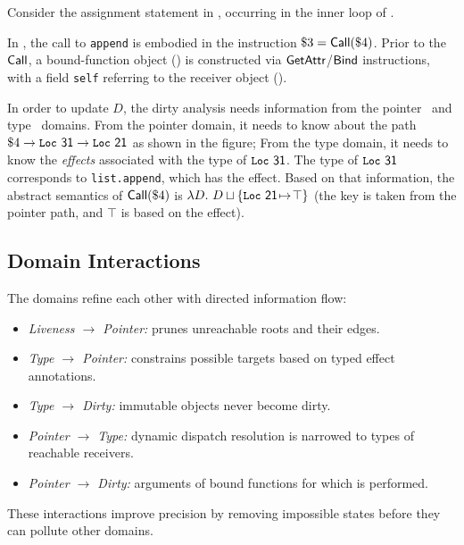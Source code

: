\begin{example}
Consider the assignment statement in ,
occurring in the inner loop of .
\end{example}

%
In \spytecode, the call to \lstinline|append| is embodied
in the instruction $\$3 = \textsf{Call}(\$4)$.
Prior to the $\textsf{Call}$, a bound-function object () is
constructed via $\textsf{GetAttr}$/$\textsf{Bind}$ instructions, with a field
\lstinline|self| referring to the receiver object ().

In order to update $D$, the dirty analysis needs information from the pointer~ and type~ domains.
From the pointer domain, it needs to know about the path $\$4\to\textsf{\texttt{\small Loc}~{31}} \to \textsf{\texttt{\small Loc}~{21}}$
as shown in the figure;
From the type domain, it needs to know the \emph{effects}
associated with the type of $\textsf{\texttt{\small Loc}~{31}}$.
The type of $\textsf{\texttt{\small Loc}~{31}}$ corresponds to \texttt{list.append},
which has the \tupdate effect.
Based on that information, the abstract semantics of
$\textsf{Call}(\$4)$ is $\lambda D.~D\sqcup\{\textsf{\texttt{\small Loc}~{21}}{\hspace{1pt}\mapsto\hspace{1pt}}\top\}$ (the key  is taken from the pointer path, and $\top$ is based on the \tupdate
effect).

\subsection{Domain Interactions}
The domains refine each other with directed information flow:
\begin{itemize}
    \item \emph{Liveness $\rightarrow$ Pointer:} prunes unreachable roots and their edges.
    \item \emph{Type $\rightarrow$ Pointer:} constrains possible targets based on typed effect annotations.
    \item \emph{Type $\rightarrow$ Dirty:} immutable objects never become dirty.
    \item \emph{Pointer $\rightarrow$ Type:} dynamic dispatch resolution is narrowed to types of reachable receivers.
    \item \emph{Pointer $\rightarrow$ Dirty:} arguments of bound functions for which \tupdate is performed.
\end{itemize}
These interactions improve precision by removing impossible states before they can pollute other domains.

